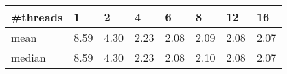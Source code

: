
                \begin{tabu}{l|XXXXXXX}
                \#threads&1 &2 &4 &6 &8 &12 &16 \\
                \hline
                mean &8.59 &4.30 &2.23 &2.08 &2.09 &2.08 &2.07 \\
                median &8.59 &4.30 &2.23 &2.08 &2.10 &2.08 &2.07 \\
                \end{tabu}
            